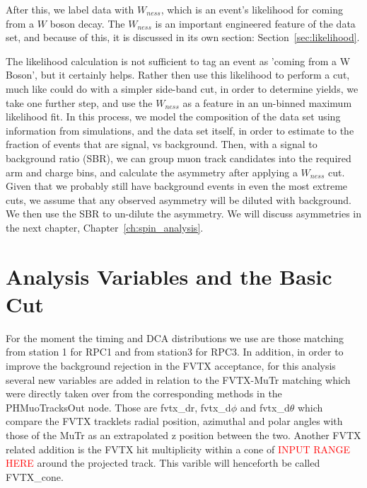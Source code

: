 After this, we label data with $W_{ness}$, which is an event's likelihood for
coming from a $W$ boson decay. The $W_{ness}$ is an important engineered feature
of the data set, and because of this, it is discussed in its own section:
Section~\ref{sec:likelihood}.

The likelihood calculation is not sufficient to tag an event as 'coming from a W
Boson', but it certainly helps. Rather then use this likelihood to perform a
cut, much like could do with a simpler side-band cut, in order to determine
yields, we take one further step, and use the $W_{ness}$ as a feature in an
un-binned maximum likelihood fit. In this process, we model the composition of
the data set using information from simulations, and the data set itself, in
order to estimate to the fraction of events that are signal, vs background.
Then, with a signal to background ratio (SBR), we can group muon track
candidates into the required arm and charge bins, and calculate the asymmetry
after applying a $W_{ness}$ cut. Given that we probably still have background
events in even the most extreme cuts, we assume that any observed asymmetry will
be diluted with background. We then use the SBR to un-dilute the asymmetry. We
will discuss asymmetries in the next chapter, Chapter~\ref{ch:spin_analysis}.

\section{Analysis Variables and the Basic Cut}

For the moment the timing and DCA distributions we use are those matching from
station 1 for RPC1 and from station3 for RPC3.  In addition, in order to improve
the background rejection in the FVTX acceptance, for this analysis several new
variables are added in relation to the FVTX-MuTr matching which were directly
taken over from the corresponding methods  in the PHMuoTracksOut node. Those are
fvtx\_dr, fvtx\_d$\phi$ and fvtx\_d$\theta$ which compare the FVTX tracklets
radial position, azimuthal and polar angles with those of the MuTr as an
extrapolated z position between the two.  Another FVTX related addition is the
FVTX hit multiplicity within a cone of \textcolor{red}{INPUT RANGE HERE}  around
the projected track. This varible will henceforth be called FVTX\_cone.  

